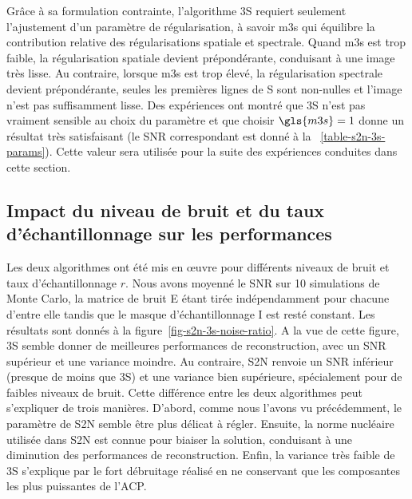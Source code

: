 Grâce à sa formulation contrainte, l'algorithme 3S requiert seulement l'ajustement d'un paramètre de régularisation, à savoir \gls{m3s} qui équilibre la contribution relative des régularisations spatiale et spectrale. Quand \gls{m3s} est trop faible, la régularisation spatiale devient prépondérante, conduisant à une image très lisse. Au contraire, lorsque \gls{m3s} est trop élevé, la régularisation spectrale devient prépondérante, seules les premières lignes de \gls{S} sont non-nulles et l'image n'est pas suffisamment lisse. Des expériences ont montré que 3S n'est pas vraiment sensible au choix du paramètre et que choisir $\gls{m3s}=1$ donne un résultat très satisfaisant (le SNR correspondant est donné à la \tabname~\ref{table-s2n-3s-params}). Cette valeur sera utilisée pour la suite des expériences conduites dans cette section.


\subsection{Impact du niveau de bruit et du taux d'échantillonnage sur les performances}

Les deux algorithmes ont été mis en \oe{}uvre pour différents niveaux de bruit et taux d'échantillonnage $r$. Nous avons moyenné le SNR sur 10 simulations de Monte Carlo, la matrice de bruit \gls{E} étant tirée indépendamment pour chacune d'entre elle tandis que le masque d'échantillonnage \gls{I} est resté constant. 
%
Les résultats sont donnés à la figure~\ref{fig-s2n-3s-noise-ratio}.
%
A la vue de cette figure, 3S semble donner de meilleures performances de reconstruction, avec un SNR supérieur et une variance moindre. Au contraire, S2N renvoie un SNR inférieur (presque  de moins que 3S) et une variance bien supérieure, spécialement pour de faibles niveaux de bruit.
%
Cette différence entre les deux algorithmes peut s'expliquer de trois manières. D'abord, comme nous l'avons vu précédemment, le paramètre de S2N semble être plus délicat à régler. Ensuite, la norme nucléaire utilisée dans S2N  est connue pour biaiser la solution, conduisant à une diminution des performances de reconstruction. Enfin, la variance très faible de 3S s'explique par le fort débruitage réalisé en ne conservant que les composantes les plus puissantes de l'ACP.

